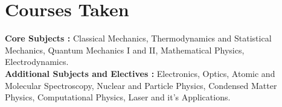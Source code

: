 \section{Courses Taken}

\textbf{Core Subjects :} Classical Mechanics, Thermodynamics and Statistical Mechanics, Quantum Mechanics I and II, Mathematical Physics, Electrodynamics. \\

\textbf{Additional Subjects and Electives :} Electronics, Optics, Atomic and Molecular Spectroscopy, Nuclear and Particle Physics, Condensed Matter Physics, Computational Physics, Laser and it's Applications.
